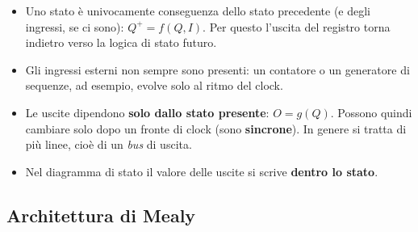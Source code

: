 \begin{fitcenter}
\end{fitcenter}

\begin{itemize}[leftmargin=1.5em, itemsep=2pt]
    \item Uno stato è univocamente conseguenza dello stato precedente (e degli ingressi, se
          ci sono): $Q^+ = f(Q, I)$. Per questo l'uscita del registro torna indietro verso
          la logica di stato futuro.
    \item Gli ingressi esterni non sempre sono presenti: un contatore o un generatore di
          sequenze, ad esempio, evolve solo al ritmo del clock.
    \item Le uscite dipendono \textbf{solo dallo stato presente}: $O = g(Q)$. Possono quindi
          cambiare solo dopo un fronte di clock (sono \textbf{sincrone}). In genere si
          tratta di più linee, cioè di un \emph{bus} di uscita.
    \item Nel diagramma di stato il valore delle uscite si scrive \textbf{dentro lo stato}.
\end{itemize}

\subsection{Architettura di Mealy}

